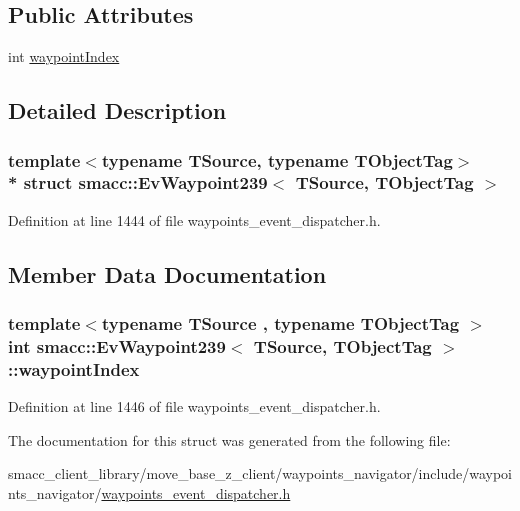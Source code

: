\subsection*{Public Attributes}
\begin{DoxyCompactItemize}
\item 
int \hyperlink{structsmacc_1_1EvWaypoint239_a0d6f9e224740052cdc23a7a18ec0955b}{waypoint\+Index}
\end{DoxyCompactItemize}


\subsection{Detailed Description}
\subsubsection*{template$<$typename T\+Source, typename T\+Object\+Tag$>$\\*
struct smacc\+::\+Ev\+Waypoint239$<$ T\+Source, T\+Object\+Tag $>$}



Definition at line 1444 of file waypoints\+\_\+event\+\_\+dispatcher.\+h.



\subsection{Member Data Documentation}
\subsubsection[{\texorpdfstring{waypoint\+Index}{waypointIndex}}]{\setlength{\rightskip}{0pt plus 5cm}template$<$typename T\+Source , typename T\+Object\+Tag $>$ int {\bf smacc\+::\+Ev\+Waypoint239}$<$ T\+Source, T\+Object\+Tag $>$\+::waypoint\+Index}\hypertarget{structsmacc_1_1EvWaypoint239_a0d6f9e224740052cdc23a7a18ec0955b}{}\label{structsmacc_1_1EvWaypoint239_a0d6f9e224740052cdc23a7a18ec0955b}


Definition at line 1446 of file waypoints\+\_\+event\+\_\+dispatcher.\+h.



The documentation for this struct was generated from the following file\+:\begin{DoxyCompactItemize}
\item 
smacc\+\_\+client\+\_\+library/move\+\_\+base\+\_\+z\+\_\+client/waypoints\+\_\+navigator/include/waypoints\+\_\+navigator/\hyperlink{waypoints__event__dispatcher_8h}{waypoints\+\_\+event\+\_\+dispatcher.\+h}\end{DoxyCompactItemize}
